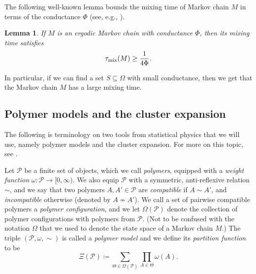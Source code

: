 \documentclass[reqno,a4paper,11pt]{amsart}
\newtheorem{lemma}[theorem]{Lemma}
\newcommand{\cP}{\mathcal{P}}
\newcommand{\om}{\omega}
\newcommand{\Om}{\Omega}
\newcommand{\tmix}{\tau_{\rm{mix}}}
\begin{document}
The following well-known lemma bounds the mixing time of Markov chain $M$ in terms of the conductance $\Phi$ (see, e.g., \cite[Theorem 7.4]{levin2017markov}). 

\begin{lemma} \label{lem:conduc_mix}
If $M$ is an ergodic Markov chain with conductance $\Phi$, then its mixing time satisfies
    \begin{equation*}
        \tmix(M)\geq\frac{1}{4\Phi}.
    \end{equation*}
\end{lemma}

In particular, if we can find a set $S \subseteq \Om$ with small conductance, then we get that the Markov chain $M$ has a large mixing time.


\subsection{Polymer models and the cluster expansion}

The following is terminology on two tools from statistical physics that we will use, namely polymer models and the cluster expansion. For more on this topic, see \cite{jenssen2020independent, kotecky1986cluster}.

Let $\cP$ be a finite set of objects, which we call \textit{polymers}, equipped with a \textit{weight function} $\om:\cP\rightarrow [0,\infty)$. We also equip $\cP$ with a symmetric, anti-reflexive relation $\sim$, and we say that two polymers $A,A'\in \cP$ are \textit{compatible} if $A\sim A'$, and \textit{incompatible} otherwise (denoted by $A\nsim A'$). We call a set of pairwise compatible polymers a \textit{polymer configuration}, and we let $\Om(\cP)$ denote the collection of polymer configurations with polymers from $\cP$. (Not to be confused with the notation $\Om$ that we used to denote the state space of a Markov chain $M$.) The triple $(\cP,\om,\sim)$ is called a \textit{polymer model} and we define its \textit{partition function} to be
$$\Xi(\cP)\coloneqq\sum_{\Theta\in\Om(\cP)}\prod_{A\in \Theta} \om(A).$$
\end{document}
